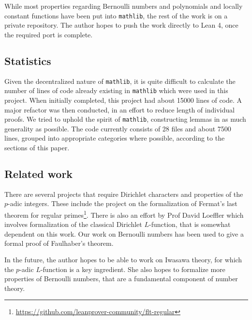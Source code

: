 \documentclass[a4paper,UKenglish,cleveref, autoref, thm-restate]{lipics-v2021}
\newcommand{\lean}[1]{\texttt{#1}\xspace} %
\begin{document}
While most properties regarding Bernoulli numbers and polynomials and locally constant functions have been put into \lean{mathlib}, the rest of the work is on a private repository. The author hopes to push the 
work directly to Lean 4, once the required port is complete.

\subsection{Statistics}
Given the decentralized nature of \lean{mathlib}, it is quite difficult to calculate the number of lines of code 
already existing in \lean{mathlib} which were used in this project. When initially completed, this project had about 
15000 lines of code. A major refactor was then conducted, in an effort to reduce length of individual proofs. 
We tried to uphold the spirit of \lean{mathlib}, constructing lemmas in as much generality as possible. %
The code currently consists of 28 files and about 7500 lines, grouped into appropriate categories where possible, 
according to the sections of this paper.

\subsection{Related work} %
There are several projects that require Dirichlet characters and properties of the $p$-adic integers. 
These include the project on the formalization of Fermat's last theorem for regular primes\footnote{\url{https://github.com/leanprover-community/flt-regular}}. 
There is also an effort by Prof David Loeffler which involves formalization of the classical Dirichlet $L$-function, that is somewhat dependent on this work. 
Our work on Bernoulli numbers has been used to give a formal proof of Faulhaber's theorem.

In the future, the author hopes to be able to work on Iwasawa theory, for which the $p$-adic $L$-function is a key ingredient. She also hopes to formalize more properties of Bernoulli numbers, 
that are a fundamental component of number theory.


\end{document}
